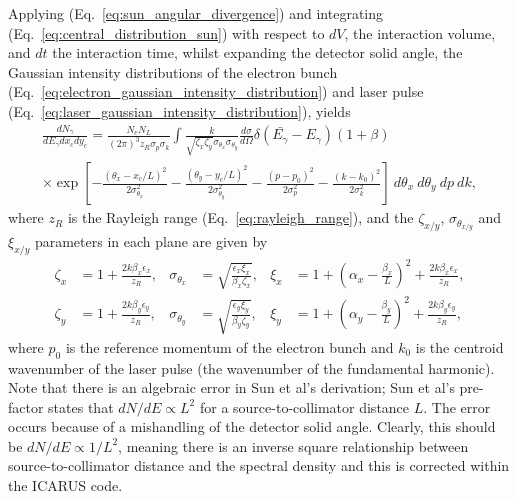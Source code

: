 \documentclass[../main.tex]{subfiles}
\begin{document}
Applying (Eq.~\ref{eq:sun_angular_divergence}) and integrating (Eq.~\ref{eq:central_distribution_sun}) with respect to $dV$, the interaction volume, and $dt$ the interaction time, whilst expanding the detector solid angle, the Gaussian intensity distributions of the electron bunch (Eq.~\ref{eq:electron_gaussian_intensity_distribution}) and laser pulse (Eq.~\ref{eq:laser_gaussian_intensity_distribution}), yields
\begin{multline}
\frac{dN_{\gamma}}{dE_{\gamma}dx_{c}dy_{c}} = \frac{N_{e}N_{L}}{\left(2\pi\right)^{3}z_{R}\sigma_{p}\sigma_{k}}\int \frac{k}{\sqrt{\zeta_{x}\zeta_{y}}\sigma_{\theta_{x}}\sigma_{\theta_{y}}}\frac{d\sigma}{d\Omega}\delta\left(\bar{E_{\gamma}}-E_{\gamma}\right)\left(1+\beta\right) \\\times\exp\left[-\frac{\left(\theta_{x}-x_{c}/L\right)^{2}}{2\sigma_{\theta_{x}}^{2}}-\frac{\left(\theta_{y}-y_{c}/L\right)^{2}}{2\sigma_{\theta_{y}}^{2}}-\frac{\left(p-p_{0}\right)^{2}}{2\sigma_{p}^{2}}-\frac{\left(k-k_{0}\right)^{2}}{2\sigma_{k}^{2}}\right]~d\theta_{x}~d\theta_{y}~dp~dk,
\label{eq:sun_volume_time_integral}    
\end{multline}
where $z_{R}$ is the Rayleigh range (Eq.~\ref{eq:rayleigh_range}), and the $\zeta_{x/y}$, $\sigma_{\theta_{x/y}}$ and $\xi_{x/y}$ parameters in each plane are given by
\begin{align}
\zeta_{x} &= 1+\frac{2k\beta_{x}\epsilon_{x}}{z_{R}}, & \sigma_{\theta_{x}} &= \sqrt{\frac{\epsilon_{x}\xi_{x}}{\beta_{x}\zeta_{x}}}, & \xi_{x} &= 1+\left(\alpha_{x}-\frac{\beta_{x}}{L}\right)^{2}+\frac{2k\beta_{x}\epsilon_{x}}{z_{R}}, \nonumber\\
\zeta_{y} &= 1+\frac{2k\beta_{y}\epsilon_{y}}{z_{R}}, & \sigma_{\theta_{y}} &= \sqrt{\frac{\epsilon_{y}\xi_{y}}{\beta_{y}\zeta_{y}}}, & \xi_{y} &= 1+\left(\alpha_{y}-\frac{\beta_{y}}{L}\right)^{2}+\frac{2k\beta_{y}\epsilon_{y}}{z_{R}}, 
\label{eq:zeta_sigmatheta_xi_parameters_sun}
\end{align}
where $p_{0}$ is the reference momentum of the electron bunch and $k_{0}$ is the centroid wavenumber of the laser pulse (the wavenumber of the fundamental harmonic). Note that there is an algebraic error in Sun et al's \cite{sun2009characterizations,sun2011theoretical} derivation; Sun et al's pre-factor states that $dN/dE\propto L^{2}$ for a source-to-collimator distance $L$. The error occurs because of a mishandling of the detector solid angle. Clearly, this should be $dN/dE\propto 1/L^{2}$, meaning there is an inverse square relationship between source-to-collimator distance and the spectral density and this is corrected within the \textsc{ICARUS} code. 
\end{document}
